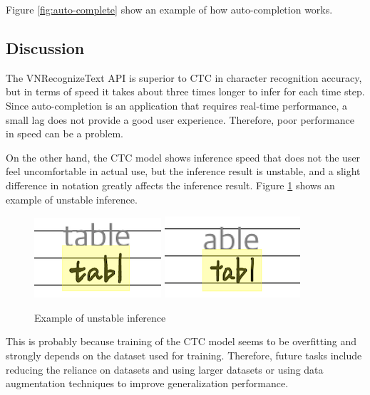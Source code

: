 Figure \ref{fig:auto-complete} show an example of how auto-completion works.

\subsection{Discussion}

The VNRecognizeText API is superior to CTC in character recognition accuracy,
but in terms of speed it takes about three times longer to infer for each time step.
Since auto-completion is an application that requires real-time performance,
a small lag does not provide a good user experience. Therefore,
poor performance in speed can be a problem.

On the other hand, the CTC model shows inference speed that does not the user
feel uncomfortable in actual use, but the inference result is unstable,
and a slight difference in notation greatly affects the inference result.
Figure \ref{fig:unstable} shows an example of unstable inference.

\begin{figure}
    \centering
    \includegraphics{images/table.png}
    \includegraphics{images/able.png}
    \caption{Example of unstable inference}
    \label{fig:unstable}
\end{figure}

This is probably because training of the CTC model seems to be overfitting
and strongly depends on the dataset used for training.
Therefore, future tasks include reducing the reliance on datasets and
using larger datasets or using data augmentation techniques to improve generalization performance.
